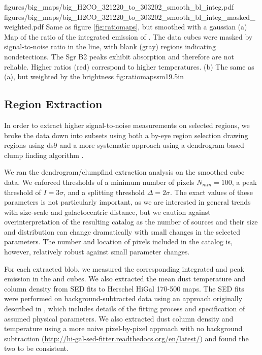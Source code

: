 \RotFigureTwoAA
{figures/big_maps/big_H2CO_321220_to_303202_smooth_bl_integ.pdf}
{figures/big_maps/big_H2CO_321220_to_303202_smooth_bl_integ_masked_weighted.pdf}
{Same as figure \ref{fig:ratiomaps}, but smoothed with a  gaussian
(a) Map of the ratio of the integrated emission of
\Rone.  The data cubes were masked by
signal-to-noise ratio in the \threeohthree line, with blank (gray) regions
indicating nondetections.  The Sgr B2 peaks exhibit \formaldehyde
absorption and therefore are not reliable.  Higher ratios (red) correspond
to higher temperatures.
\newline
(b) The same as (a), but weighted by the \threeohthree brightness
\newline
}
{fig:ratiomapssm}{1}{9.5in}

\subsection{Region Extraction}
In order to extract higher signal-to-noise measurements on selected regions, we
broke the data down into subsets using both a by-eye region selection drawing
regions using ds9 and a more systematic approach using a dendrogram-based clump
finding algorithm \citep[][\url{http://dendrograms.org/}]{Rosolowsky2008c}.

We ran the dendrogram/clumpfind extraction analysis on the smoothed
\threeohthree cube data.  We enforced thresholds of a minimum number of pixels
$N_{min}=100$, a peak threshold of $I = 3\sigma$, and a splitting threshold
$\Delta = 2\sigma$.  The exact values of these parameters is not particularly
important, as we are interested in general trends with size-scale and
galactocentric distance, but we caution against overinterpretation of the
resulting catalog as the number of sources and their size and distribution can
change dramatically with small changes in the selected parameters.  The number
and location of pixels included in the catalog is, however, relatively robust
against small parameter changes.

For each extracted blob, we measured the corresponding integrated and peak
emission in the \threetwoone and \thirteenco cubes.  We also extracted the mean
dust temperature and column density from SED fits to Herschel HiGal 170-500\um
maps.  The SED fits were performed on background-subtracted data using an
approach originally described in \citet{Battersby2011a}, which includes details
of the fitting process and specification of assumed physical parameters.  We
also extracted dust column density and temperature using a more naive
pixel-by-pixel approach with no background subtraction
(\url{http://hi-gal-sed-fitter.readthedocs.org/en/latest/}) and found the two
to be consistent.

